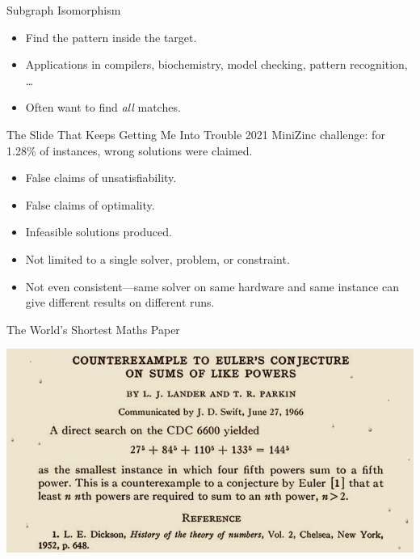 \documentclass[aspectratio=169,compress,10pt]{beamer}
\begin{document}
\begin{frame}{Subgraph Isomorphism}
{}

    \begin{itemize}
        \item Find the \textcolor{uofgcobalt}{pattern} inside the \textcolor{uofgcobalt}{target}.
        \item Applications in compilers, biochemistry, model checking, pattern recognition, \ldots
        \item Often want to find \emph{all} matches.
    \end{itemize}
\end{frame}

\begin{frame}{The Slide That Keeps Getting Me Into Trouble}
    2021 MiniZinc challenge: for 1.28\% of instances, wrong solutions were claimed.
    \\
    \begin{itemize}
        \item False claims of unsatisfiability.
        \item False claims of optimality.
        \item Infeasible solutions produced.
        \item Not limited to a single solver, problem, or constraint.
        \item Not even consistent---same solver on same hardware and same instance can give
            different results on different runs.
    \end{itemize}
\end{frame}

\begin{frame}{The World's Shortest Maths Paper}
    \begin{center}\includegraphics[scale=0.34]{shortest-math-paper.jpg}\end{center}
\end{frame}
\end{document}
